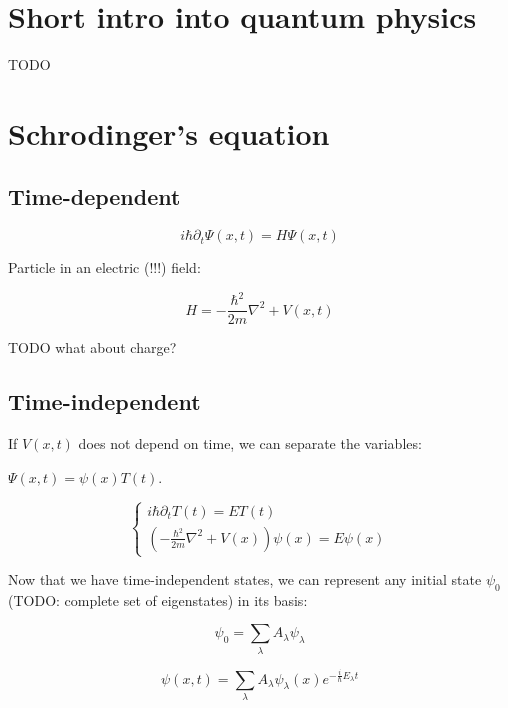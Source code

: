 \documentclass[12pt, a4paper]{article}
\begin{document}
\section{Short intro into quantum physics}
TODO

\section{Schrodinger's equation}

\subsection{Time-dependent}

$$i \hbar \partial_t \Psi(x, t) = H \Psi(x, t)$$

Particle in an electric (!!!) field:

$$H = - \frac{\hbar^2}{2 m} \nabla^2 + V(x, t)$$

TODO what about charge?

\subsection{Time-independent}

If $V(x, t)$ does not depend on time, we can separate the variables:

$\Psi(x, t) = \psi(x) T(t)$.

$$\begin{cases}
i \hbar \partial_t T(t) = E T(t) \\
(- \frac{\hbar^2}{2 m} \nabla^2 + V(x)) \psi(x) = E \psi(x)
\end{cases}$$

Now that we have time-independent states, we can represent any initial state $\psi_0$ (TODO: complete set of eigenstates) in its basis:

$$\psi_0 = \sum\limits_\lambda A_\lambda \psi_\lambda$$

$$\psi(x, t) = \sum\limits_\lambda A_\lambda \psi_\lambda(x) e^{- \frac{i}{\hbar} E_\lambda t}$$
\end{document}
